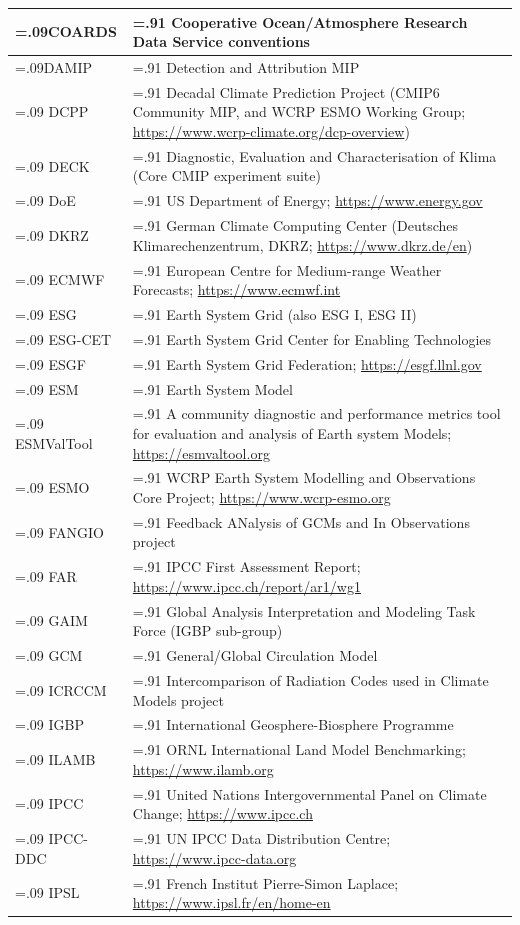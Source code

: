 \documentclass[gmd, preprint]{copernicus}
\begin{document}
\begin{table}[htp]
{\begin{tabularx}{1\textwidth} { 
	  | >{\raggedright\arraybackslash\hsize=.09\hsize}X
	  | >{\centering\arraybackslash\hsize=.91\hsize}X | }
COARDS & Cooperative Ocean/Atmosphere Research Data Service conventions \\
\hline
DAMIP & Detection and Attribution MIP \\
\hline
DCPP & Decadal Climate Prediction Project (CMIP6 Community MIP, and WCRP ESMO Working Group; \url{https://www.wcrp-climate.org/dcp-overview}) \\
\hline
DECK & Diagnostic, Evaluation and Characterisation of Klima (Core CMIP experiment suite) \\
\hline
DoE & US Department of Energy; \url{https://www.energy.gov} \\
\hline
DKRZ & German Climate Computing Center (Deutsches Klimarechenzentrum, DKRZ; \url{https://www.dkrz.de/en}) \\
\hline
ECMWF & European Centre for Medium-range Weather Forecasts; \url{https://www.ecmwf.int} \\
\hline
ESG & Earth System Grid (also ESG I, ESG II) \\
\hline
ESG-CET & Earth System Grid Center for Enabling Technologies \\
\hline
ESGF & Earth System Grid Federation; \url{https://esgf.llnl.gov} \\
\hline
ESM & Earth System Model \\
\hline
ESMValTool & A community diagnostic and performance metrics tool for evaluation and analysis of Earth system Models; \url{https://esmvaltool.org} \\
\hline
ESMO & WCRP Earth System Modelling and Observations Core Project; \url{https://www.wcrp-esmo.org} \\
\hline
FANGIO & Feedback ANalysis of GCMs and In Observations project \\
\hline
FAR & IPCC First Assessment Report; \url{https://www.ipcc.ch/report/ar1/wg1} \\
\hline
GAIM & Global Analysis Interpretation and Modeling Task Force (IGBP sub-group) \\
\hline
GCM & General/Global Circulation Model \\
\hline
ICRCCM & Intercomparison of Radiation Codes used in Climate Models project \\
\hline
IGBP & International Geosphere-Biosphere Programme \\
\hline
ILAMB & ORNL International Land Model Benchmarking; \url{https://www.ilamb.org} \\
\hline
IPCC & United Nations Intergovernmental Panel on Climate Change; \url{https://www.ipcc.ch} \\
\hline
IPCC-DDC & UN IPCC Data Distribution Centre; \url{https://www.ipcc-data.org} \\
\hline
IPSL & French Institut Pierre-Simon Laplace; \url{https://www.ipsl.fr/en/home-en} \\
\hline
\end{tabularx}
} %
\label{tab:tabAppE1-Acronyms}
\end{table}
\end{document}
